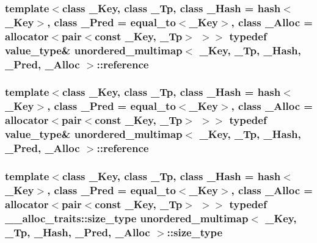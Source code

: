 \subsubsection[{reference}]{\setlength{\rightskip}{0pt plus 5cm}template$<$class \+\_\+\+Key, class \+\_\+\+Tp, class \+\_\+\+Hash = hash$<$\+\_\+\+Key$>$, class \+\_\+\+Pred = equal\+\_\+to$<$\+\_\+\+Key$>$, class \+\_\+\+Alloc = allocator$<$pair$<$const \+\_\+\+Key, \+\_\+\+Tp$>$ $>$$>$ typedef {\bf value\+\_\+type}\& {\bf unordered\+\_\+multimap}$<$ \+\_\+\+Key, \+\_\+\+Tp, \+\_\+\+Hash, \+\_\+\+Pred, \+\_\+\+Alloc $>$\+::{\bf reference}}\label{classunordered__multimap_a0c14a599081fd7cef3adfd73572a78be}
\hypertarget{classunordered__multimap_a0c14a599081fd7cef3adfd73572a78be}{}
\subsubsection[{reference}]{\setlength{\rightskip}{0pt plus 5cm}template$<$class \+\_\+\+Key, class \+\_\+\+Tp, class \+\_\+\+Hash = hash$<$\+\_\+\+Key$>$, class \+\_\+\+Pred = equal\+\_\+to$<$\+\_\+\+Key$>$, class \+\_\+\+Alloc = allocator$<$pair$<$const \+\_\+\+Key, \+\_\+\+Tp$>$ $>$$>$ typedef {\bf value\+\_\+type}\& {\bf unordered\+\_\+multimap}$<$ \+\_\+\+Key, \+\_\+\+Tp, \+\_\+\+Hash, \+\_\+\+Pred, \+\_\+\+Alloc $>$\+::{\bf reference}}\label{classunordered__multimap_a0c14a599081fd7cef3adfd73572a78be}
\hypertarget{classunordered__multimap_a977c4093df6d4d0302f280de19af4b58}{}
\subsubsection[{size\+\_\+type}]{\setlength{\rightskip}{0pt plus 5cm}template$<$class \+\_\+\+Key, class \+\_\+\+Tp, class \+\_\+\+Hash = hash$<$\+\_\+\+Key$>$, class \+\_\+\+Pred = equal\+\_\+to$<$\+\_\+\+Key$>$, class \+\_\+\+Alloc = allocator$<$pair$<$const \+\_\+\+Key, \+\_\+\+Tp$>$ $>$$>$ typedef \+\_\+\+\_\+alloc\+\_\+traits\+::size\+\_\+type {\bf unordered\+\_\+multimap}$<$ \+\_\+\+Key, \+\_\+\+Tp, \+\_\+\+Hash, \+\_\+\+Pred, \+\_\+\+Alloc $>$\+::{\bf size\+\_\+type}}\label{classunordered__multimap_a977c4093df6d4d0302f280de19af4b58}
\hypertarget{classunordered__multimap_a977c4093df6d4d0302f280de19af4b58}{}
